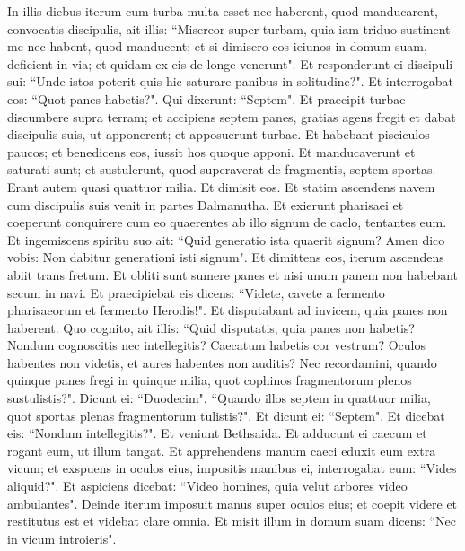 \begin{biblechapter}  
\verse In illis diebus iterum cum turba multa esset nec haberent, quod manducarent, convocatis discipulis, ait illis: 
\verse “Misereor super turbam, quia iam triduo sustinent me nec habent, quod manducent; 
\verse et si dimisero eos ieiunos in domum suam, deficient in via; et quidam ex eis de longe venerunt". 
\verse Et responderunt ei discipuli sui: “Unde istos poterit quis hic saturare panibus in solitudine?". 
\verse Et interrogabat eos: “Quot panes habetis?". Qui dixerunt: “Septem". 
\verse Et praecipit turbae discumbere supra terram; et accipiens septem panes, gratias agens fregit et dabat discipulis suis, ut apponerent; et apposuerunt turbae. 
\verse Et habebant pisciculos paucos; et benedicens eos, iussit hos quoque apponi. 
\verse Et manducaverunt et saturati sunt; et sustulerunt, quod superaverat de fragmentis, septem sportas. 
\verse Erant autem quasi quattuor milia. Et dimisit eos. 
\verse Et statim ascendens navem cum discipulis suis venit in partes Dalmanutha.  
\verse Et exierunt pharisaei et coeperunt conquirere cum eo quaerentes ab illo signum de caelo, tentantes eum. 
\verse Et ingemiscens spiritu suo ait: “Quid generatio ista quaerit signum? Amen dico vobis: Non dabitur generationi isti signum". 
\verse Et dimittens eos, iterum ascendens abiit trans fretum. 
\verse Et obliti sunt sumere panes et nisi unum panem non habebant secum in navi.  
\verse Et praecipiebat eis dicens: “Videte, cavete a fermento pharisaeorum et fermento Herodis!". 
\verse Et disputabant ad invicem, quia panes non haberent.  
\verse Quo cognito, ait illis: “Quid disputatis, quia panes non habetis? Nondum cognoscitis nec intellegitis? Caecatum habetis cor vestrum? 
\verse Oculos habentes non videtis, et aures habentes non auditis? Nec recordamini, 
\verse quando quinque panes fregi in quinque milia, quot cophinos fragmentorum plenos sustulistis?". Dicunt ei: “Duodecim". 
\verse “Quando illos septem in quattuor milia, quot sportas plenas fragmentorum tulistis?". Et dicunt ei: “Septem". 
\verse Et dicebat eis: “Nondum intellegitis?". 
\verse Et veniunt Bethsaida. Et adducunt ei caecum et rogant eum, ut illum tangat. 
\verse Et apprehendens manum caeci eduxit eum extra vicum; et exspuens in oculos eius, impositis manibus ei, interrogabat eum: “Vides aliquid?". 
\verse Et aspiciens dicebat: “Video homines, quia velut arbores video ambulantes". 
\verse Deinde iterum imposuit manus super oculos eius; et coepit videre et restitutus est et videbat clare omnia. 
\verse Et misit illum in domum suam dicens: “Nec in vicum introieris". 

\end{biblechapter}
